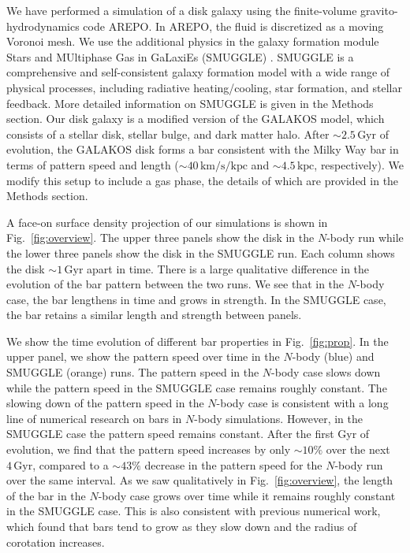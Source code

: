 \documentclass{natureprintstyle}
\newcommand{\Nbody}{$N$-body}
\begin{document}
We have performed a simulation of a disk galaxy using the finite-volume
gravito-hydrodynamics code AREPO.\cite{2010MNRAS.401..791S} In AREPO, the
fluid is discretized as a moving Voronoi mesh. We use the additional physics
in the galaxy formation module Stars and MUltiphase Gas in GaLaxiEs (SMUGGLE)
\cite{2019MNRAS.489.4233M}. SMUGGLE is a comprehensive and self-consistent
galaxy formation model with a wide range of physical processes, including
radiative heating/cooling, star formation, and stellar feedback. More detailed
information on SMUGGLE is given in the Methods section. Our disk galaxy is a
modified version of the GALAKOS model\cite{2020ApJ...890..117D}, which
consists of a stellar disk, stellar bulge, and dark matter halo. After
$\sim2.5\,\textrm{Gyr}$ of evolution, the GALAKOS disk forms a bar consistent
with the Milky Way bar in terms of pattern speed and length
($\sim40\,\textrm{km}/\textrm{s}/\textrm{kpc}$ and $\sim4.5\,\textrm{kpc}$,
respectively). We modify this setup to include a gas phase, the details of
which are provided in the Methods section.

A face-on surface density projection of our simulations is shown in
Fig.~\ref{fig:overview}. The upper three panels show the disk in the \Nbody{}
run while the lower three panels show the disk in the SMUGGLE run. Each column
shows the disk $\sim1\,\textrm{Gyr}$ apart in time. There is a large
qualitative difference in the evolution of the bar pattern between the two
runs. We see that in the \Nbody{} case, the bar lengthens in time and grows in
strength. In the SMUGGLE case, the bar retains a similar length and strength
between panels.

We show the time evolution of different bar properties in Fig.~\ref{fig:prop}.
In the upper panel, we show the pattern speed over time in the \Nbody{} (blue)
and SMUGGLE (orange) runs. The pattern speed in the \Nbody{} case slows down
while the pattern speed in the SMUGGLE case remains roughly constant. The
slowing down of the pattern speed in the \Nbody{} case is consistent with a long
line of numerical research on bars in \Nbody{}
simulations.\cite{1992ApJ...400...80H, 2000ApJ...543..704D,
2002MNRAS.330...35A, 2002ApJ...569L..83A, 2003MNRAS.341.1179A,
2003MNRAS.346..251O, 2005MNRAS.363..991H, 2006ApJ...637..214M,
2007MNRAS.375..460W, 2009ApJ...697..293D} However, in the SMUGGLE case the
pattern speed remains constant. After the first Gyr of evolution, we find that
the pattern speed increases by only $\sim10\%$ over the next
$4\,\textrm{Gyr}$, compared to a $\sim43\%$ decrease in the pattern speed for
the \Nbody{} run over the same interval. As we saw qualitatively in
Fig.~\ref{fig:overview}, the length of the bar in the \Nbody{} case grows over
time while it remains roughly constant in the SMUGGLE case. This is also
consistent with previous numerical work, which found that bars tend to grow as
they slow down and the radius of corotation
increases.\cite{2000ApJ...543..704D, 2003MNRAS.341.1179A}
\end{document}
